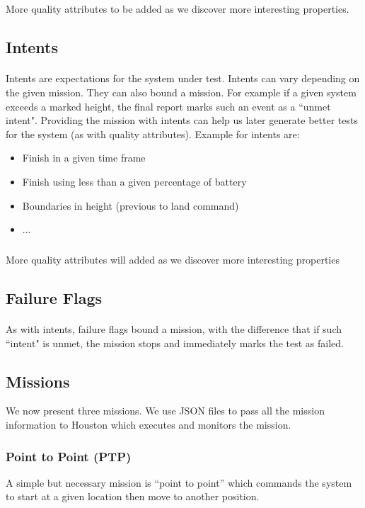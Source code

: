 \documentclass[11pt, a4paper]{article}
\begin{document}
\subparagraph{}
More quality attributes to be added as we discover more interesting properties.

\subsection{Intents}
\paragraph{}
Intents are expectations for the system under test. Intents can vary depending on the given mission. They can also bound a mission. For example if a given system exceeds a marked height, the final report marks such an event as a ``unmet intent". Providing the mission with intents can help us later generate better tests for the system (as with quality attributes). Example for intents are:
\begin{itemize}
	\itemsep-.5em
	\item Finish in a given time frame
	\item Finish using less than a given percentage of battery  
	\item Boundaries in height (previous to land command)
	\item ...		
\end{itemize}
\subparagraph{}
More quality attributes will added as we discover more interesting properties

\subsection{Failure Flags}
\paragraph{}
As with intents, failure flags bound a mission, with the difference that if such ``intent" is unmet, the mission stops and immediately marks the test as failed.  

\subsection{Missions}
We now present three missions. We use JSON files to pass all the mission information to Houston which executes and monitors the mission.
\subsubsection{Point to Point (PTP)}
A simple but necessary mission is “point to point” which commands the system to start at a given location then move to another position.
\end{document}
